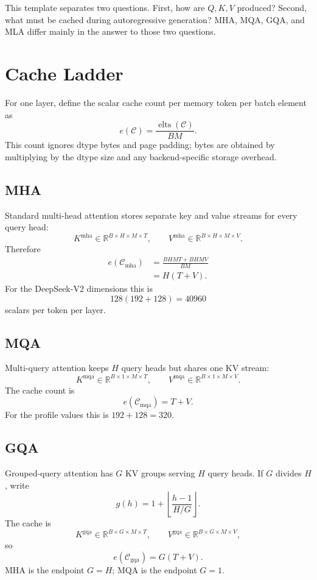 \documentclass[11pt]{article}
\newcommand{\R}{\mathbb{R}}
\newcommand{\elts}{\operatorname{elts}}
\newcommand{\cache}{\mathcal{C}}
\begin{document}
This template separates two questions.  First, how are $Q,K,V$ produced?
Second, what must be cached during autoregressive generation?  MHA, MQA, GQA,
and MLA differ mainly in the answer to those two questions.

\section{Cache Ladder}

For one layer, define the scalar cache count per memory token per batch element
as
\[
  e(\cache)=\frac{\elts(\cache)}{BM}.
\]
This count ignores dtype bytes and page padding; bytes are obtained by
multiplying by the dtype size and any backend-specific storage overhead.

\subsection{MHA}

Standard multi-head attention stores separate key and value streams for every
query head:
\[
  K^{\mathrm{mha}}\in\R^{B\times H\times M\times T},
  \qquad
  V^{\mathrm{mha}}\in\R^{B\times H\times M\times V}.
\]
Therefore
\[
\begin{aligned}
  e(\cache_{\mathrm{mha}})
  &=\frac{B H M T + B H M V}{B M}  \\
  &=H(T+V).
\end{aligned}
\]
For the DeepSeek-V2 dimensions this is
\[
  128(192+128)=40960
\]
scalars per token per layer.

\subsection{MQA}

Multi-query attention keeps $H$ query heads but shares one KV stream:
\[
  K^{\mathrm{mqa}}\in\R^{B\times 1\times M\times T},
  \qquad
  V^{\mathrm{mqa}}\in\R^{B\times 1\times M\times V}.
\]
The cache count is
\[
  e(\cache_{\mathrm{mqa}})=T+V.
\]
For the profile values this is $192+128=320$.

\subsection{GQA}

Grouped-query attention has $G$ KV groups serving $H$ query heads.  If $G$
divides $H$, write
\[
  g(h)=1+\left\lfloor\frac{h-1}{H/G}\right\rfloor .
\]
The cache is
\[
  K^{\mathrm{gqa}}\in\R^{B\times G\times M\times T},
  \qquad
  V^{\mathrm{gqa}}\in\R^{B\times G\times M\times V},
\]
so
\[
  e(\cache_{\mathrm{gqa}})=G(T+V).
\]
MHA is the endpoint $G=H$; MQA is the endpoint $G=1$.
\end{document}

